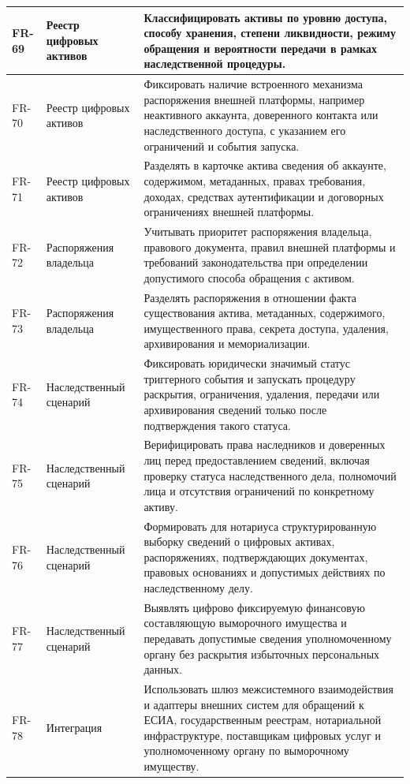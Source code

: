 \begin{longtable}{|P{1.45cm}|P{3.35cm}|P{10.7cm}|}
FR-69 & Реестр цифровых активов & Классифицировать активы по уровню доступа, способу хранения, степени ликвидности, режиму обращения и вероятности передачи в рамках наследственной процедуры.\\ \hline
FR-70 & Реестр цифровых активов & Фиксировать наличие встроенного механизма распоряжения внешней платформы, например неактивного аккаунта, доверенного контакта или наследственного доступа, с указанием его ограничений и события запуска.\\ \hline
FR-71 & Реестр цифровых активов & Разделять в карточке актива сведения об аккаунте, содержимом, метаданных, правах требования, доходах, средствах аутентификации и договорных ограничениях внешней платформы.\\ \hline
FR-72 & Распоряжения владельца & Учитывать приоритет распоряжения владельца, правового документа, правил внешней платформы и требований законодательства при определении допустимого способа обращения с активом.\\ \hline
FR-73 & Распоряжения владельца & Разделять распоряжения в отношении факта существования актива, метаданных, содержимого, имущественного права, секрета доступа, удаления, архивирования и мемориализации.\\ \hline
FR-74 & Наследственный сценарий & Фиксировать юридически значимый статус триггерного события и запускать процедуру раскрытия, ограничения, удаления, передачи или архивирования сведений только после подтверждения такого статуса.\\ \hline
FR-75 & Наследственный сценарий & Верифицировать права наследников и доверенных лиц перед предоставлением сведений, включая проверку статуса наследственного дела, полномочий лица и отсутствия ограничений по конкретному активу.\\ \hline
FR-76 & Наследственный сценарий & Формировать для нотариуса структурированную выборку сведений о цифровых активах, распоряжениях, подтверждающих документах, правовых основаниях и допустимых действиях по наследственному делу.\\ \hline
FR-77 & Наследственный сценарий & Выявлять цифрово фиксируемую финансовую составляющую выморочного имущества и передавать допустимые сведения уполномоченному органу без раскрытия избыточных персональных данных.\\ \hline
FR-78 & Интеграция & Использовать шлюз межсистемного взаимодействия и адаптеры внешних систем для обращений к ЕСИА, государственным реестрам, нотариальной инфраструктуре, поставщикам цифровых услуг и уполномоченному органу по выморочному имуществу.\\ \hline

\end{longtable}
